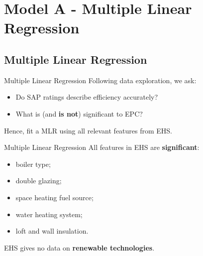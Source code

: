 \section{Model A - Multiple Linear Regression}

\subsection{Multiple Linear Regression}

\begin{frame}{Multiple Linear Regression}
    Following data exploration, we ask:

    \vspace{1.0 em}

    \begin{itemize}
        \setlength\itemsep{16.0pt}
        \item Do SAP ratings describe efficiency accurately?
        \item What is (and \textbf{is not}) significant to EPC?
    \end{itemize}

    \vspace{1.0 em}

    Hence, fit a MLR using all relevant features from EHS.
\end{frame}

\begin{frame}{Multiple Linear Regression}
    All features in EHS are \textbf{significant}:

    \begin{itemize}
        \item boiler type;
        \item double glazing;
        \item space heating fuel source;
        \item water heating system;
        \item loft and wall insulation.
    \end{itemize}

    \vspace{0.5 em}

    EHS gives no data on \textbf{renewable technologies}.
\end{frame}